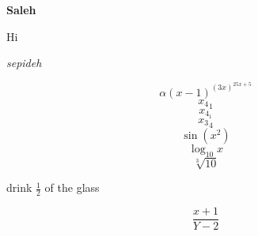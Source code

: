 \documentclass[11pt]{article}
\begin{document}
\bf Saleh

\rm Hi

\it sepideh 

$$\alpha(x-1)^{(3x)^{25x+5}}$$
$${x_4}_1$$
$$x_{4_1}$$
$${x_3}_4$$
$$\sin(x^2)$$
$$\log_{10}{x}$$
$$\sqrt[3]{10}$$

drink $\displaystyle{\frac{1}{2}}$ of the glass



$$\frac{x+1}{Y-2}$$
\end{document}
